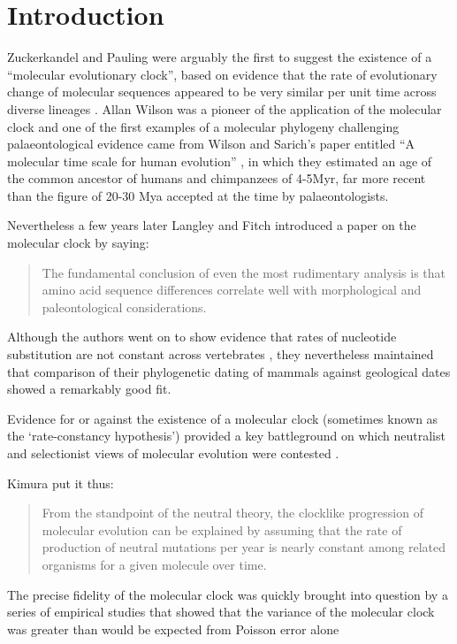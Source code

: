 \section{Introduction} 
Zuckerkandel and Pauling were arguably the first to suggest the existence of a ``molecular evolutionary clock'', based on evidence that the rate of evolutionary change of molecular sequences appeared to be very similar per unit time across diverse lineages \cite{zuckerkandl1965}. Allan Wilson was a pioneer of the application of the molecular clock and one of the first examples of a molecular phylogeny challenging palaeontological evidence came from Wilson and Sarich's paper entitled ``A molecular time scale for human evolution'' \cite{WilsonSarich1969}, in which they estimated an age of the common ancestor of humans and chimpanzees of 4-5Myr, far more recent than the figure of 20-30 Mya accepted at the time by palaeontologists.

Nevertheless a few years later Langley and Fitch \cite{LangleyFitch1974} introduced a paper on the molecular clock by saying:

\begin{quotation}
The fundamental conclusion of even the most rudimentary analysis is that amino acid sequence differences correlate well with morphological and paleontological considerations.
\end{quotation}

Although the authors went on to show evidence that rates of nucleotide substitution are not constant across vertebrates \cite{LangleyFitch1974}, they nevertheless maintained that comparison of their phylogenetic dating of mammals against geological dates showed a remarkably good fit. 

Evidence for or against the existence of a molecular clock (sometimes known as the `rate-constancy hypothesis') provided a key battleground on which neutralist and selectionist views of molecular evolution were contested \cite{Kimura1987}.

Kimura \cite{Kimura1987} put it thus:

\begin{quotation}
From the standpoint of the neutral theory, the clocklike progression of molecular evolution can be explained by assuming that the rate of production of neutral mutations per year is nearly constant among related organisms for a given molecule over time. 
\end{quotation}
 
The precise fidelity of the molecular clock was quickly brought into question by a series of empirical studies that showed that the variance of the molecular clock was greater than would be expected from Poisson error alone \cite{}  

  
  
  
  
  
  
  
  
  
  
  
  
  
  
  
  
  
  
  
  